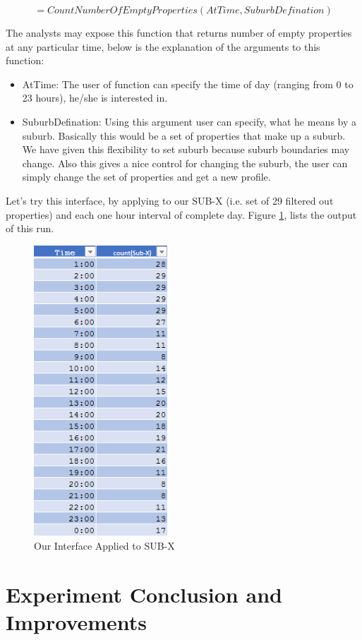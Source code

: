\documentclass[12pt]{report}
\theoremstyle{named}
\begin{document}
\[=CountNumberOfEmptyProperties(AtTime,SuburbDefination)\]

The analysts may expose this function that returns number of empty properties at any particular time, below is the explanation of the arguments to this function:

\begin{itemize}
  \item AtTime: The user of function can specify the time of day (ranging from 0 to 23 hours), he/she is interested in.
  \item SuburbDefination: Using this argument user can specify, what he means by a suburb. Basically this would be a set of properties that make up a suburb. We have given this flexibility to set suburb because suburb boundaries may change. Also this gives a nice control for changing the suburb, the user can simply change the set of properties and get a new profile.
\end{itemize}

Let's try this interface, by applying to our SUB-X (i.e. set of 29 filtered out properties) and each one hour interval of complete day. Figure \ref{fig:InterfaceRun}, lists the output of this run.
\begin{figure}[ht]
\centering
        \includegraphics[width=50mm,scale=1]{Images/InterfaceRun.PNG}
    \caption{Our Interface Applied to SUB-X}
    \label{fig:InterfaceRun}
\end{figure}

\section{Experiment Conclusion and Improvements}
\end{document}
